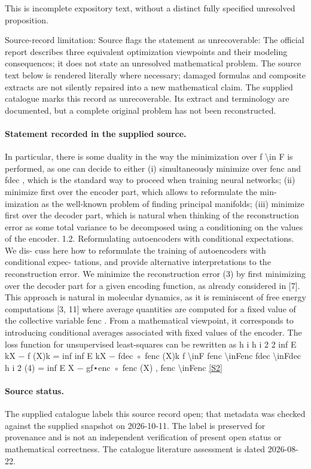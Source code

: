 \documentclass[11pt]{article}
\begin{document}
This is incomplete expository text, without a distinct fully specified unresolved proposition.

Source-record limitation: Source flags the statement as unrecoverable: The official report describes three equivalent optimization viewpoints and their modeling consequences; it does not state an unresolved mathematical problem.
The source text below is rendered literally where necessary; damaged formulas and composite extracts are not silently repaired into a new mathematical claim.
The supplied catalogue marks this record as unrecoverable. Its extract and terminology are documented, but a complete original problem has not been reconstructed.
\paragraph{Statement recorded in the supplied source.}
In particular, there is some duality in the way the minimization over f \textbackslash{}in F is performed, as one can decide to either (i) simultaneously minimize over fenc and fdec , which is the standard way to proceed when training neural networks; (ii) minimize first over the encoder part, which allows to reformulate the min- imization as the well-known problem of finding principal manifolds; (iii) minimize first over the decoder part, which is natural when thinking of the reconstruction error as some total variance to be decomposed using a conditioning on the values of the encoder. 1.2. Reformulating autoencoders with conditional expectations. We dis- cuss here how to reformulate the training of autoencoders with conditional expec- tations, and provide alternative interpretations to the reconstruction error. We minimize the reconstruction error (3) by first minimizing over the decoder part for a given encoding function, as already considered in [7]. This approach is natural in molecular dynamics, as it is reminiscent of free energy computations [3, 11] where average quantities are computed for a fixed value of the collective variable fenc . From a mathematical viewpoint, it corresponds to introducing conditional averages associated with fixed values of the encoder. The loss function for unsupervised least-squares can be rewritten as h i h i 2 2 inf E kX − f (X)k = inf inf E kX − fdec ◦ fenc (X)k f \textbackslash{}inF fenc \textbackslash{}inFenc fdec \textbackslash{}inFdec h i 2 (4) = inf E X − gf⋆enc ◦ fenc (X) , fenc \textbackslash{}inFenc \href{https://doi.org/10.4171/owr/2024/26}{[S2]}
\paragraph{Source status.}
The supplied catalogue labels this source record open; that metadata was checked against the supplied snapshot on 2026-10-11. The label is preserved for provenance and is not an independent verification of present open status or mathematical correctness. The catalogue literature assessment is dated 2026-08-22.
\end{document}
